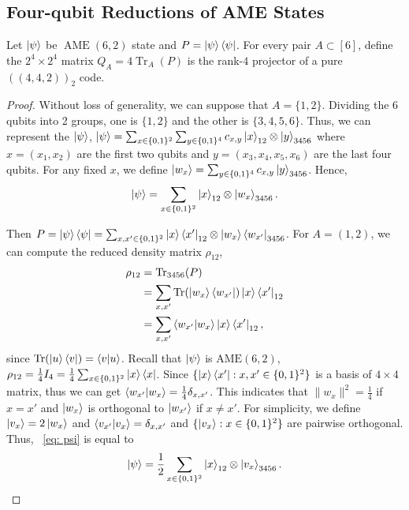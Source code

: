 \subsection{Four-qubit Reductions of AME States}

\begin{lemma}\label{lem: QA is orth proj of pure 442}
    Let $\ket{\psi}$ be $\operatorname{AME}(6,2)$ state and $P=\ket{\psi}\bra{\psi}$. For every pair $A\subset [6]$, define the $2^4\times 2^4$ matrix $Q_A=4 \operatorname{Tr}_A(P)$ is the rank-$4$ projector of a pure $((4,4,2))_2$ code.
\end{lemma}

\begin{proof}
    Without loss of generality, we can suppose that $A=\{1,2\}$. Dividing the 6 qubits into 2 groups, one is $\{1,2\}$ and the other is $\{3,4,5,6\}$. Thus, we can represent the $\ket{\psi}$, $\ket{\psi}=\sum_{x\in\{0,1\}^2}\sum_{y\in\{0,1\}^4} c_{x,y} \ket{x}_{12}\otimes \ket{y}_{3456}$ where $x=(x_1,x_2)$ are the first two qubits and $y=(x_3,x_4,x_5,x_6)$ are the last four qubits. For any fixed $x$, we define $\ket{w_x}=\sum_{y\in\{0,1\}^4}c_{x,y}\ket{y}_{3456}$. Hence, 
    \begin{equation}\label{eq: psi}
        \ket{\psi}=\sum_{x\in\{0,1\}^2}\ket{x}_{12}\otimes\ket{w_x}_{3456}.
    \end{equation}

    Then $P=\ket{\psi}\bra{\psi}=\sum_{x,x'\in \{0,1\}^2}\ket{x}\bra{x'}_{12}\otimes \ket{w_x}\bra{w_{x'}}_{3456}$. For $A=(1,2)$, we can compute the reduced density matrix $\rho_{12}$,
    \begin{align}
        \rho_{12}&=\operatorname{Tr}_{3456}(P)\\
        &=\sum_{x,x'} \operatorname{Tr}(\ket{w_x}\bra{w_{x'}})\ket{x}\bra{x'}_{12}\\
        &=\sum_{x,x'}\braket{w_{x'}|w_x}\ket{x}\bra{x'}_{12},\label{eq: rho_12}
    \end{align}
    since $\operatorname{Tr}(\ket{u}\bra{v})=\braket{v|u}$. Recall that $\ket{\psi}$ is $\mathrm{AME}(6,2)$, $\rho_{12}=\frac{1}{4}I_4=\frac{1}{4}\sum_{x\in\{0,1\}^2}\ket{x}\bra{x}$. Since $\{\ket{x}\bra{x'}:x,x'\in\{0,1\}^2\}$ is a basis of $4\times 4$ matrix, thus we can get $\braket{w_{x'}|w_x}=\frac{1}{4}\delta_{x,x'}$.
    This indicates that $\lVert w_x\rVert^2=\frac{1}{4}$ if $x=x'$ and $\ket{w_x}$ is orthogonal to $\ket{w_{x'}}$ if $x\neq x'$. For simplicity, we define $\ket{v_x}=2\ket{w_x}$ and $\braket{v_{x'}|v_x}=\delta_{x,x'}$ and $\{\ket{v_x}:x\in\{0,1\}^2\}$ are pairwise orthogonal. Thus, ~\eqref{eq: psi} is equal to
    \begin{equation}\label{eq: psi v}
        \ket{\psi}=\frac{1}{2}\sum_{x\in\{0,1\}^2}\ket{x}_{12}\otimes \ket{v_x}_{3456}.
    \end{equation}


\end{proof}
